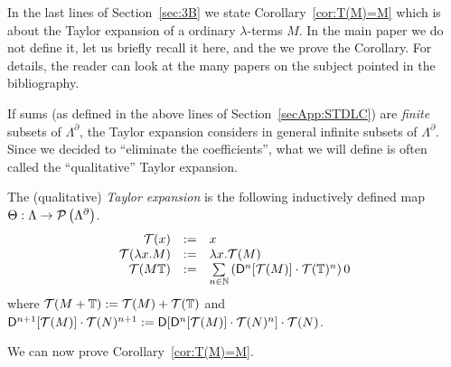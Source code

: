 In the last lines of Section~\ref{sec:3B} we state Corollary~\ref{cor:T(M)=M} which is about the Taylor expansion of a ordinary $\lambda$-terms $M$.
In the main paper we do not define it, let us briefly recall it here, and the we prove the Corollary.
For details, the reader can look at the many papers on the subject pointed in the bibliography.

If sums (as defined in the above lines of Section~\ref{secApp:STDLC}) are \emph{finite} subsets of $\Lambda^\partial$, the Taylor expansion considers in general infinite subsets of $\Lambda^\partial$.
Since we decided to ``eliminate the coefficients'', what we will define is often called the ``qualitative'' Taylor expansion.

\begin{definition}
 
 The (qualitative) \emph{Taylor expansion} is the following inductively defined map $\Theta : \Lambda \to \mathcal{P}\left(\Lambda^\partial\right)$.
\[\begin{array}{rcl}
 \mathcal{T}(x) & := & x \\
 \mathcal{T}(\lambda x.M) & := & \lambda x.\mathcal{T}(M) \\
 \mathcal{T}(M\mathbb{T}) & := & \sum\limits_{n\in\mathbb{N}} \left(\mathsf{D}^n [\mathcal{T}(M)] \cdot \mathcal{T}(\mathbb{T})^n\right)0
\end{array}\]
where $\mathcal{T}(M+\mathbb{T}):=\mathcal{T}(M)+\mathcal{T}(\mathbb{T})$ and $\mathsf{D}^{n+1} [\mathcal{T}(M)] \cdot \mathcal{T}(N)^{n+1}:=\mathsf{D}[\mathsf{D}^n [\mathcal{T}(M)] \cdot \mathcal{T}(N)^n] \cdot \mathcal{T}(N)$.
\end{definition}

We can now prove Corollary~\ref{cor:T(M)=M}.

